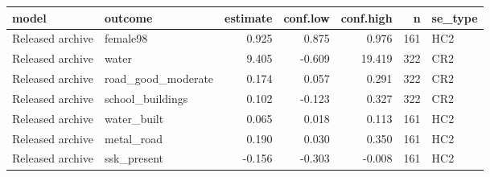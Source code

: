 
\begin{tabular}{llrrrrl}
\toprule
model & outcome & estimate & conf.low & conf.high & n & se\_type\\
\midrule
Released archive & female98 & 0.925 & 0.875 & 0.976 & 161 & HC2\\
Released archive & water & 9.405 & -0.609 & 19.419 & 322 & CR2\\
Released archive & road\_good\_moderate & 0.174 & 0.057 & 0.291 & 322 & CR2\\
Released archive & school\_buildings & 0.102 & -0.123 & 0.327 & 322 & CR2\\
Released archive & water\_built & 0.065 & 0.018 & 0.113 & 161 & HC2\\
\addlinespace
Released archive & metal\_road & 0.190 & 0.030 & 0.350 & 161 & HC2\\
Released archive & ssk\_present & -0.156 & -0.303 & -0.008 & 161 & HC2\\
\bottomrule
\end{tabular}
